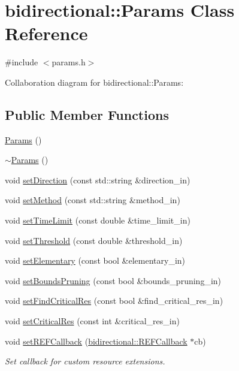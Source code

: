 \hypertarget{classbidirectional_1_1Params}{}\section{bidirectional\+:\+:Params Class Reference}
\label{classbidirectional_1_1Params}


{\ttfamily \#include $<$params.\+h$>$}



Collaboration diagram for bidirectional\+:\+:Params\+:
\subsection*{Public Member Functions}
\begin{DoxyCompactItemize}
\item 
\hyperlink{classbidirectional_1_1Params_a4873db87f0c812884543365b3a075de2}{Params} ()
\item 
\hyperlink{classbidirectional_1_1Params_a2f4b540e09b10800d412da8af5ddfb2a}{$\sim$\+Params} ()
\item 
void \hyperlink{classbidirectional_1_1Params_a8cd76d63403256defcfff896d33a4fc6}{set\+Direction} (const std\+::string \&direction\+\_\+in)
\item 
void \hyperlink{classbidirectional_1_1Params_ac469873b9d5dbc166ee387b9ddc968f5}{set\+Method} (const std\+::string \&method\+\_\+in)
\item 
void \hyperlink{classbidirectional_1_1Params_a6d2cd9d82200130aa3bca9f207e85422}{set\+Time\+Limit} (const double \&time\+\_\+limit\+\_\+in)
\item 
void \hyperlink{classbidirectional_1_1Params_a6c8b580515f2730f7b8362c8c86efc4d}{set\+Threshold} (const double \&threshold\+\_\+in)
\item 
void \hyperlink{classbidirectional_1_1Params_aeb8196a318f012a4fb1756c4f267f030}{set\+Elementary} (const bool \&elementary\+\_\+in)
\item 
void \hyperlink{classbidirectional_1_1Params_adc2cc88c79856b8f6aed271b99c60bd2}{set\+Bounds\+Pruning} (const bool \&bounds\+\_\+pruning\+\_\+in)
\item 
void \hyperlink{classbidirectional_1_1Params_a3c344fd31c2bd86c4308e65169546a1b}{set\+Find\+Critical\+Res} (const bool \&find\+\_\+critical\+\_\+res\+\_\+in)
\item 
void \hyperlink{classbidirectional_1_1Params_a4cb80c6a553af542ee696b63f031d547}{set\+Critical\+Res} (const int \&critical\+\_\+res\+\_\+in)
\item 
void \hyperlink{classbidirectional_1_1Params_a1f73fd12554f071113a5487a78e53d49}{set\+R\+E\+F\+Callback} (\hyperlink{classbidirectional_1_1REFCallback}{bidirectional\+::\+R\+E\+F\+Callback} $\ast$cb)
\begin{DoxyCompactList}\small\item\em Set callback for custom resource extensions. \end{DoxyCompactList}\end{DoxyCompactItemize}

